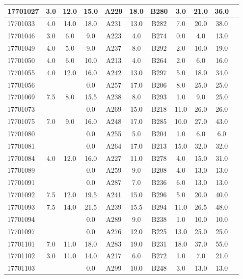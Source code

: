 \documentclass[12pt]{article}
\begin{document}
\begin{center}
\begin{small}
\begin{tabular}{|l|c|c|c|c|c|c|c|c|c|c|}
17701027 & 3.0 & 12.0 & 15.0 & A229 & 18.0 & B280 & 3.0 & 21.0 & 36.0\\ \hline 
17701033 & 4.0 & 14.0 & 18.0 & A231 & 13.0 & B282 & 7.0 & 20.0 & 38.0\\ \hline 
17701046 & 3.0 & 6.0 & 9.0 & A223 & 4.0 & B274 & 0.0 & 4.0 & 13.0\\ \hline 
17701049 & 4.0 & 5.0 & 9.0 & A237 & 8.0 & B292 & 2.0 & 10.0 & 19.0\\ \hline 
17701050 & 4.0 & 6.0 & 10.0 & A213 & 4.0 & B264 & 2.0 & 6.0 & 16.0\\ \hline 
17701055 & 4.0 & 12.0 & 16.0 & A242 & 13.0 & B297 & 5.0 & 18.0 & 34.0\\ \hline 
17701056 &  &  & 0.0 & A257 & 17.0 & B206 & 8.0 & 25.0 & 25.0\\ \hline 
17701069 & 7.5 & 8.0 & 15.5 & A238 & 8.0 & B293 & 1.0 & 9.0 & 25.0\\ \hline 
17701073 &  &  & 0.0 & A269 & 15.0 & B218 & 11.0 & 26.0 & 26.0\\ \hline 
17701075 & 7.0 & 9.0 & 16.0 & A248 & 17.0 & B285 & 10.0 & 27.0 & 43.0\\ \hline 
17701080 &  &  & 0.0 & A255 & 5.0 & B204 & 1.0 & 6.0 & 6.0\\ \hline 
17701081 &  &  & 0.0 & A264 & 17.0 & B213 & 15.0 & 32.0 & 32.0\\ \hline 
17701084 & 4.0 & 12.0 & 16.0 & A227 & 11.0 & B278 & 4.0 & 15.0 & 31.0\\ \hline 
17701089 &  &  & 0.0 & A259 & 9.0 & B208 & 4.0 & 13.0 & 13.0\\ \hline 
17701091 &  &  & 0.0 & A287 & 7.0 & B236 & 6.0 & 13.0 & 13.0\\ \hline 
17701092 & 7.5 & 12.0 & 19.5 & A241 & 15.0 & B296 & 5.0 & 20.0 & 40.0\\ \hline 
17701093 & 7.5 & 14.0 & 21.5 & A239 & 15.5 & B294 & 11.0 & 26.5 & 48.0\\ \hline 
17701094 &  &  & 0.0 & A289 & 9.0 & B238 & 1.0 & 10.0 & 10.0\\ \hline 
17701097 &  &  & 0.0 & A276 & 12.0 & B225 & 13.0 & 25.0 & 25.0\\ \hline 
17701101 & 7.0 & 11.0 & 18.0 & A283 & 19.0 & B231 & 18.0 & 37.0 & 55.0\\ \hline 
17701102 & 3.0 & 11.0 & 14.0 & A217 & 6.0 & B272 & 1.0 & 7.0 & 21.0\\ \hline 
17701103 &  &  & 0.0 & A299 & 10.0 & B248 & 3.0 & 13.0 & 13.0\\ \hline 
        \end{tabular}
            \end{small}
            \end{center}
  \centering
            
\end{document}

